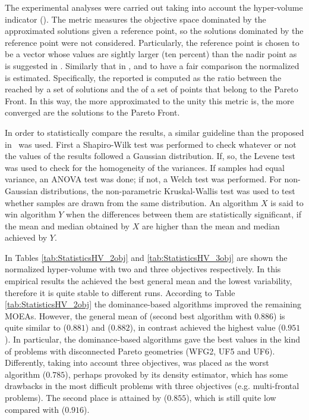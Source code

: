 The experimental analyses were carried out taking into account the hyper-volume indicator (\HV{}).
%
The \HV{} metric measures the objective space dominated by the approximated solutions given a reference point, so the solutions dominated by the reference point were not considered.
%
Particularly, the reference point is chosen to be a vector whose values are sightly larger (ten percent) than the nadir point as is suggested in \cite{ishibuchi2017reference}.
%
Similarly that in \cite{li2015evolutionary}, and to have a fair comparison the normalized \HV{} is estimated.
%
Specifically, the \HV{} reported is computed as the ratio between the \HV{} reached by a set of solutions and the \HV{} of a set of points that belong to the Pareto Front.
%
In this way, the more approximated to the unity this metric is, the more converged are the solutions to the Pareto Front.
%

%
In order to statistically compare the \HV{} results, a similar guideline than the proposed in~\cite{Joel:StatisticalTest} was used. 
%
First a Shapiro-Wilk test was performed to check whatever or not the values of the results followed a Gaussian distribution. 
%
If, so, the Levene test was used to check for the homogeneity of the variances. 
%
If samples had equal variance, an ANOVA test was done; if not, a Welch test was performed. 
%
For non-Gaussian distributions, the non-parametric Kruskal-Wallis test was used to test whether samples are drawn from the same distribution. 
%
An algorithm $X$ is said to win algorithm $Y$ when the differences between them are statistically significant, if the mean and median obtained by $X$ are higher than the mean and median achieved by $Y$.
%

In Tables \ref{tab:StatisticsHV_2obj} and \ref{tab:StatisticsHV_3obj} are shown the normalized hyper-volume with two and three objectives respectively.
%
In this empirical results the \VSDMOEA{} achieved the best general mean and the lowest variability, therefore it is quite stable to different runs.
%
According to Table \ref{tab:StatisticsHV_2obj} the dominance-based algorithms improved the remaining MOEAs.
%
However, the general mean of \NSGAII{} (second best algorithm with $0.886$) is quite similar to \MOEAD{} ($0.881$) and \RMOEA{} ($0.882$), in contrast \VSDMOEA{} achieved the highest \HV{} value ($0.951$).
%
In particular, the dominance-based algorithms gave the best values in the kind of problems with disconnected Pareto geometries (WFG2, UF5 and UF6).
%
Differently, taking into account three objectives, \NSGAII{} was placed as the worst algorithm ($0.785$), perhaps provoked by its density estimator, which has some drawbacks in the most difficult problems with three objectives (e.g. multi-frontal problems).
%
The second place is attained by \RMOEA{} ($0.855$), which is still quite low compared with \VSDMOEA{} ($0.916$).
%


